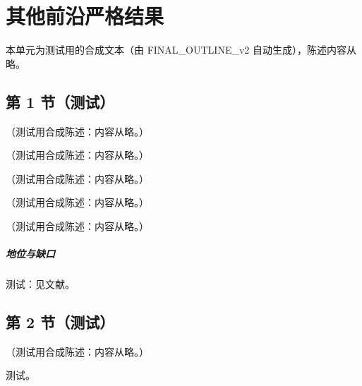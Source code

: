 \chapter{其他前沿严格结果}\label{ch:front}
本单元为测试用的合成文本（由 FINAL\_OUTLINE\_v2 自动生成），陈述内容从略。

\section{第 1 节（测试）}\label{sec:front-intro}

\begin{definition}\label{def:front-trap}
（测试用合成陈述：内容从略。）
\end{definition}

\begin{lemma}\label{lem:front-min-norm}
（测试用合成陈述：内容从略。）
\end{lemma}

\begin{remark}\label{rem:front-gordan-collins}
（测试用合成陈述：内容从略。）
\end{remark}

\begin{example}[二维中的两种情形]\label{ex:front-gordan-2d}
（测试用合成陈述：内容从略。）
\end{example}

\begin{proposition}\label{prop:front-anomalous}
（测试用合成陈述：内容从略。）
\end{proposition}
\paragraph{地位与缺口}测试：见文献。

\section{第 2 节（测试）}\label{sec:front-landau}

\begin{theorem}\label{thm:front-collins-pinch}
（测试用合成陈述：内容从略。）
\end{theorem}
\begin{proofsketch}测试。\end{proofsketch}
